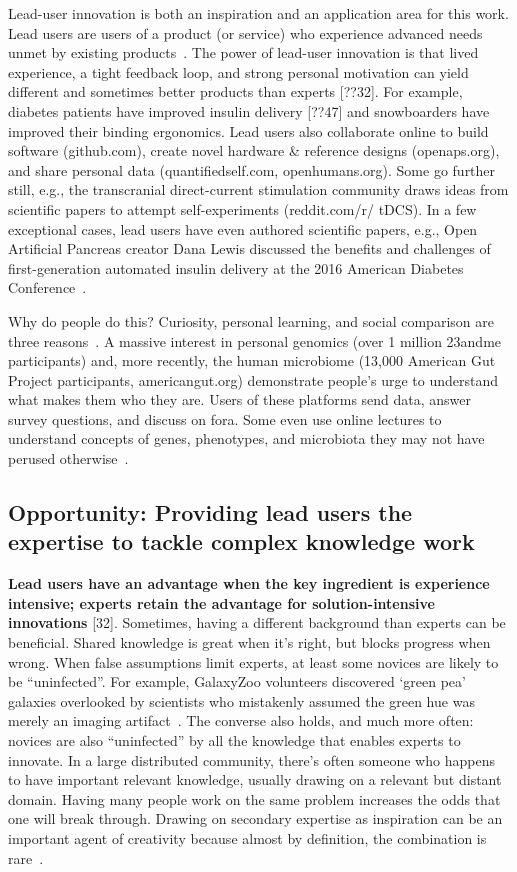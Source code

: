 Lead-user innovation is both an inspiration and an application area for this work. Lead users are
users of a product (or service) who experience advanced needs unmet by existing products~\cite{VonHippel2005}. The
power of lead-user innovation is that lived experience, a tight feedback loop, and strong personal
motivation can yield different and sometimes better products than experts [??32]. For example, diabetes
patients have improved insulin delivery [??47] and snowboarders have improved their binding
ergonomics. Lead users also collaborate online to build software
(github.com), create novel hardware \& reference designs
(openaps.org), and share personal data (quantifiedself.com,
openhumans.org). Some go further still, e.g., the transcranial
direct-current stimulation community draws ideas from scientific
papers to attempt self-experiments (reddit.com/r/
tDCS). In a few exceptional cases, lead users have even authored
scientific papers, e.g., Open Artificial Pancreas creator
Dana Lewis discussed the benefits and challenges of first-generation
automated insulin delivery at the 2016 American
Diabetes Conference~\cite{DanaLewis}.

Why do people do this? Curiosity, personal learning, and social
comparison are three reasons~\cite{Reinecke2015}. A massive interest in
personal genomics (over 1 million 23andme participants)
and, more recently, the human microbiome (13,000 American
Gut Project participants, americangut.org) demonstrate
people’s urge to understand what makes them who they are.
Users of these platforms send data, answer survey questions,
and discuss on fora. Some even use online lectures to understand
concepts of genes, phenotypes, and microbiota they
may not have perused otherwise~\cite{23andMe2017, Knight2016}. 

\subsection{Opportunity: Providing lead users the expertise to tackle complex knowledge work}
\textbf{Lead users have an advantage when the key ingredient is experience intensive; experts retain the
advantage for solution-intensive innovations} [32].  Sometimes, having a different background than experts can be beneficial. Shared knowledge is great when it’s right, but blocks progress when wrong. When false assumptions limit experts, at least some novices are likely to be “uninfected”. For example, GalaxyZoo volunteers discovered ‘green pea’ galaxies overlooked by scientists who mistakenly assumed the green hue was merely an imaging artifact~\cite{Tinati2015}. The converse also holds, and much more often: novices are also “uninfected” by all the knowledge that enables experts to innovate. In a large distributed community, there’s often someone who happens to have important relevant knowledge, usually drawing on a relevant but distant domain. Having many people work on the same problem increases the odds that one will break through. Drawing on secondary expertise as inspiration can be an important agent of creativity because almost by definition, the combination is rare~\cite{Boden2004}. 

